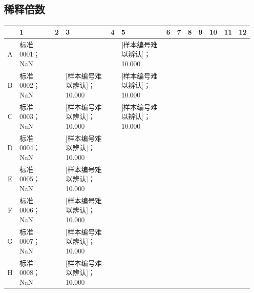 \documentclass[UTF8,10pt,a4paper,fontset=fandol]{ctexart}
\newcommand{\fieldvalue}[1]{#1}
\begin{document}
\subsection{稀释倍数}

\small
\begin{tabular}{c|p{1.05cm}|p{1.05cm}|p{1.05cm}|p{1.05cm}|p{1.05cm}|p{1.05cm}|p{1.05cm}|p{1.05cm}|p{1.05cm}|p{1.05cm}|p{1.05cm}|p{1.05cm}}
 & 1 & 2 & 3 & 4 & 5 & 6 & 7 & 8 & 9 & 10 & 11 & 12\\ \hline
A &
\fieldvalue{标准0001；NaN}
&
&
&
&
\fieldvalue{[样本编号难以辨认]；10.000}
&
&
&
&
&
&
&
\\ \hline
B &
\fieldvalue{标准0002；NaN}
&
&
\fieldvalue{[样本编号难以辨认]；10.000}
&
&
\fieldvalue{[样本编号难以辨认]；10.000}
&
&
&
&
&
&
&
\\ \hline
C &
\fieldvalue{标准0003；NaN}
&
&
\fieldvalue{[样本编号难以辨认]；10.000}
&
&
\fieldvalue{[样本编号难以辨认]；10.000}
&
&
&
&
&
&
&
\\ \hline
D &
\fieldvalue{标准0004；NaN}
&
&
\fieldvalue{[样本编号难以辨认]；10.000}
&
&
&
&
&
&
&
&
&
\\ \hline
E &
\fieldvalue{标准0005；NaN}
&
&
\fieldvalue{[样本编号难以辨认]；10.000}
&
&
&
&
&
&
&
&
&
\\ \hline
F &
\fieldvalue{标准0006；NaN}
&
&
\fieldvalue{[样本编号难以辨认]；10.000}
&
&
&
&
&
&
&
&
&
\\ \hline
G &
\fieldvalue{标准0007；NaN}
&
&
\fieldvalue{[样本编号难以辨认]；10.000}
&
&
&
&
&
&
&
&
&
\\ \hline
H &
\fieldvalue{标准0008；NaN}
&
&
\fieldvalue{[样本编号难以辨认]；10.000}
&
&
&
&
&
&
&
&
&
\\
\end{tabular}
\normalsize
\end{document}
